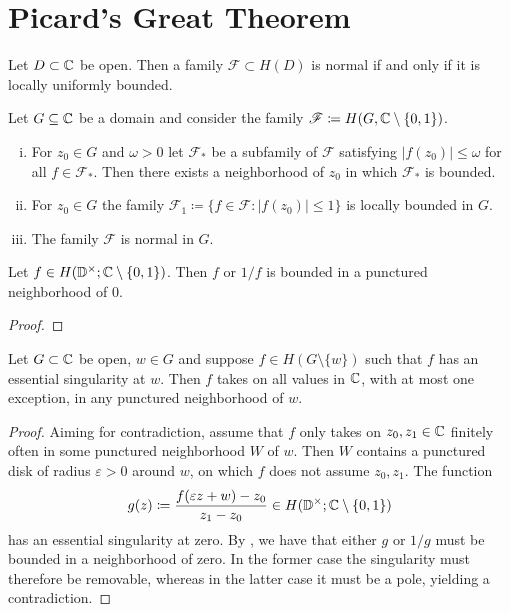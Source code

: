 \section{Picard's Great Theorem}
\label{sec:picards-great-theorem}

\begin{theorem}[Montel] \label{thm:montel}
    Let $D \subset \mathbb{C}$ be open. Then a family $\mathscr{F} \subset H(D)$ is normal if and only if it is locally uniformly bounded.
\end{theorem}

\begin{lemma} \label{lem:montel-sharpened}
    Let $G \subseteq \mathbb{C}$ be a domain and consider the family $\mathscr{F} \coloneqq H(G, \mathbb{C} \setminus \{ 0, 1 \})$.
    \begin{enumerate}[i.]
        \item For $z_0 \in G$ and $\omega > 0$ let $\mathscr{F}_*$ be a subfamily of $\mathscr{F}$ satisfying $\vert f(z_0) \vert \leq \omega$ for all $f \in \mathscr{F}_*$. Then there exists a neighborhood of $z_0$ in which $\mathscr{F}_*$ is bounded.
        \item For $z_0 \in G$ the family $\mathscr{F}_1 \coloneqq \{ f \in \mathscr{F} : \vert f(z_0) \vert \leq 1 \}$ is locally bounded in $G$.
        \item The family $\mathscr{F}$ is normal in $G$.
    \end{enumerate}
\end{lemma}

\begin{lemma} \label{lem:great-picard-bounded}
    Let $f \in H(\mathbb{D}^\times; \mathbb{C} \setminus \{ 0, 1 \})$. Then $f$ or $1/f$ is bounded in a punctured neighborhood of $0$.
\end{lemma}

\begin{proof}
\end{proof}

\begin{theorem} \label{thm:picards-great-theorem}
    Let $G \subset \mathbb{C}$ be open, $w \in G$ and suppose $f \in H(G \setminus \{ w \})$ such that $f$ has an essential singularity at $w$. Then $f$ takes on all values in $\mathbb{C}$, with at most one exception, in any punctured neighborhood of $w$.
\end{theorem}

\begin{proof}
    Aiming for contradiction, assume that $f$ only takes on $z_0, z_1 \in \mathbb{C}$ finitely often in some punctured neighborhood $W$ of $w$. Then $W$ contains a punctured disk of radius $\varepsilon > 0$ around $w$, on which $f$ does not assume $z_0, z_1$. The function
    $$ g(z) \coloneqq \frac{f(\varepsilon z + w) - z_0}{z_1 - z_0} \in H(\mathbb{D}^\times; \mathbb{C} \setminus \{ 0, 1 \}) $$
    has an essential singularity at zero. By , we have that either $g$ or $1/g$ must be bounded in a neighborhood of zero. In the former case the singularity must therefore be removable, whereas in the latter case it must be a pole, yielding a contradiction.
\end{proof}


